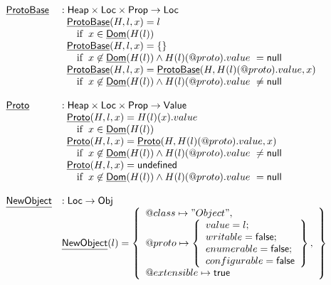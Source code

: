 \documentclass{article}
\makeatletter
\newcommand{\SF}[1]{\mbox{\textsf{#1}}}
\newcommand{\ifc}[1]{{\rm if}\begin{array}[t]{l}#1\end{array}}
\newcommand{\Heap}{\SF{Heap}}
\newcommand{\Loc}{\SF{Loc}}
\newcommand{\Prop}{\SF{Prop}}
\newcommand{\Obj}{\SF{Obj}}
\newcommand{\Value}{\SF{Value}}
\newcommand{\set}[1]{\left\{\begin{array}{l}#1\end{array}\right\}}
\newcommand{\hf}[1]{\underline{\sf #1}}
\newcommand{\varprop}[1]{@#1}
\newcommand{\vtrue}{\SF{true}}
\newcommand{\vfalse}{\SF{false}}
\makeatother
\begin{document}
\[
\begin{array}{ll}
\hf{ProtoBase} & : \Heap \times \Loc \times \Prop \rightarrow \Loc\\
& 
\begin{array}{ll}
  \hf{ProtoBase}(H,l,x) = l &\\
    \quad\ifc{x\in\hf{Dom}(H(l))}&\\
  \hf{ProtoBase}(H,l,x) = \{ \} &\\
    \quad\ifc{x\not\in\hf{Dom}(H(l)) \land H(l)(\varprop{proto}).value\ = \SF{null}}&\\
  \hf{ProtoBase}(H,l,x) =  \hf{ProtoBase}(H,H(l)(\varprop{proto}).value,x) &\\
    \quad\ifc{x\not\in\hf{Dom}(H(l)) \land H(l)(\varprop{proto}).value\ \neq \SF{null}}&\\
\end{array}\\
\\
\hf{Proto} & : \Heap \times \Loc \times \Prop \rightarrow \Value\\
& 
\begin{array}{ll}
  \hf{Proto}(H,l,x) =  H(l)(x).value &\\
    \quad\ifc{x\in\hf{Dom}(H(l))}&\\
  \hf{Proto}(H,l,x) =  \hf{Proto}(H,H(l)(\varprop{proto}).value,x) &\\
    \quad\ifc{ x\not\in\hf{Dom}(H(l)) \land H(l)(\varprop{proto}).value\ \neq \SF{null}}\\
  \hf{Proto}(H,l,x) = \SF{undefined} &\\
    \quad\ifc{ x\not\in\hf{Dom}(H(l)) \land H(l)(\varprop{proto}).value\ = \SF{null}}\\
\end{array}\\
\\
\hf{NewObject} & : \Loc \rightarrow \Obj \\
& \hf{NewObject}(l) = \set{\varprop{class}\mapsto "Object",\\
  \varprop{proto}\mapsto
  \set{
    value=l;\\writable=\vfalse;\\
    enumerable=\vfalse;\\configurable=\vfalse\\
    },\\
  \varprop{extensible}\mapsto \vtrue}\\\\


\end{array}\]
\end{document}
